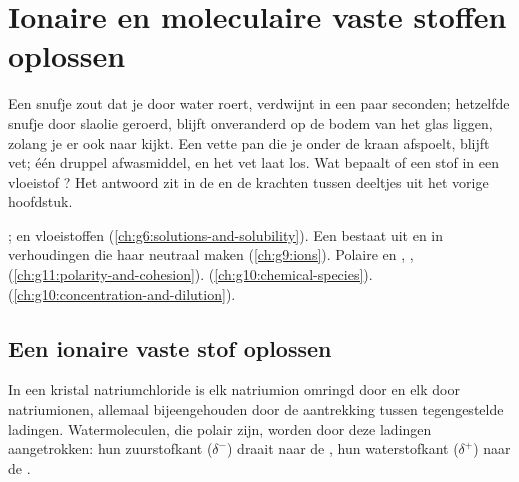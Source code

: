 \chapter{Ionaire en moleculaire vaste stoffen oplossen}\label{ch:g11:dissolution}

Een snufje zout dat je door water roert, verdwijnt in een paar seconden;
hetzelfde snufje door slaolie geroerd, blijft onveranderd op de bodem van
het glas liggen, zolang je er ook naar kijkt. Een vette pan die je onder
de kraan afspoelt, blijft vet; één druppel afwasmiddel, en het vet laat
los. Wat bepaalt of een stof in een vloeistof ? Het antwoord zit
in de  en de krachten tussen deeltjes uit het vorige
hoofdstuk.

\begin{recall}
;  en  vloeistoffen
(\cref{ch:g6:solutions-and-solubility}). Een  bestaat uit
 en  in verhoudingen die haar neutraal maken
(\cref{ch:g9:ions}). Polaire en , ,
 (\cref{ch:g11:polarity-and-cohesion}).
 (\cref{ch:g10:chemical-species}).  (\cref{ch:g10:concentration-and-dilution}).
\end{recall}

\section{Een ionaire vaste stof oplossen}

In een kristal natriumchloride is elk natriumion  omringd door
  en elk  door natriumionen, allemaal
bijeengehouden door de aantrekking tussen tegengestelde ladingen.
Watermoleculen, die polair zijn, worden door deze ladingen aangetrokken:
hun zuurstofkant ($\delta^-$) draait naar de , hun waterstofkant
($\delta^+$) naar de .

